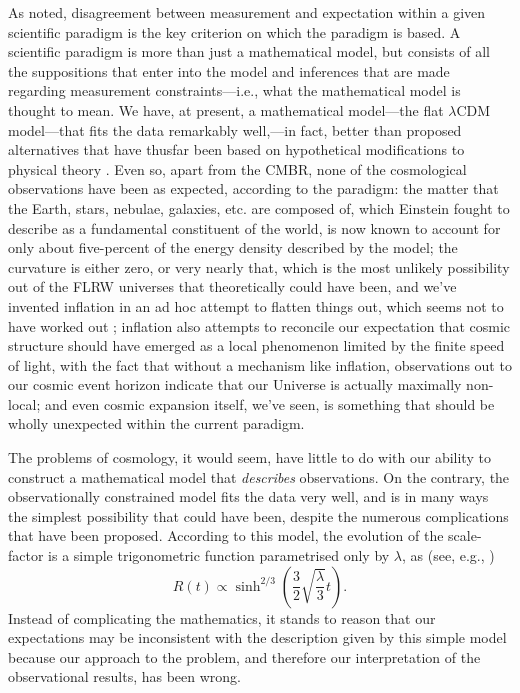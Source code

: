 \documentclass[12 pt]{article}
\begin{document}
As \citet{Ijjas2013} noted, disagreement between measurement and expectation within a given scientific paradigm is the key criterion on which the paradigm is based. A scientific paradigm is more than just a mathematical model, but consists of all the suppositions that enter into the model and inferences that are made regarding measurement constraints---i.e., what the mathematical model is thought to mean.  We have, at present, a mathematical model---the flat $\lambda$CDM model---that fits the data remarkably well,---in fact, better than proposed alternatives that have thusfar been based on hypothetical modifications to physical theory \citep{Riess2004,Riess2007,Davis2007,Hicken2009,Riess2011,Suzuki2012,Hinshaw2013,Ade2013}. Even so, apart from the CMBR, none of the cosmological observations have been as expected, according to the paradigm: the matter that the Earth, stars, nebulae, galaxies, etc. are composed of, which Einstein fought to describe as a fundamental constituent of the world, is now known to account for only about five-percent of the energy density described by the model; the curvature is either zero, or very nearly that, which is the most unlikely possibility out of the FLRW universes that theoretically could have been, and we've invented inflation in an ad hoc attempt to flatten things out, which seems not to have worked out \citep{Steinhardt2011,Ijjas2013}; inflation also attempts to reconcile our expectation that cosmic structure should have emerged as a local phenomenon limited by the finite speed of light, with the fact that without a mechanism like inflation, observations out to our cosmic event horizon indicate that our Universe is actually maximally non-local; and even cosmic expansion itself, we've seen, is something that should be wholly unexpected within the current paradigm.   

The problems of cosmology, it would seem, have little to do with our ability to construct a mathematical model that \textit{describes} observations. On the contrary, the observationally constrained model fits the data very well, and is in many ways the simplest possibility that could have been, despite the numerous complications that have been proposed. According to this model, the evolution of the scale-factor is a simple trigonometric function parametrised only by $\lambda$, as (see, e.g., \citet{Janzen2012a,Janzen2012b})
\begin{equation}
R(t)\propto\sinh^{2/3}\left(\frac{3}{2}\sqrt{\frac{\lambda}{3}}t\right).
\end{equation}
Instead of complicating the mathematics, it stands to reason that our expectations may be inconsistent with the description given by this simple model because our approach to the problem, and therefore our interpretation of the observational results, has been wrong. 
\end{document}
